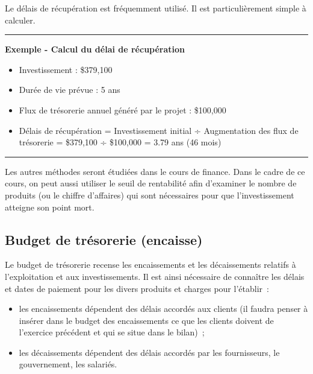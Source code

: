 \documentclass[oneside]{kaobook}
\begin{document}
Le délais de récupération est fréquemment utilisé. Il est particulièrement simple à calculer.

\noindent\rule{\textwidth}{0.5pt}
\textbf{Exemple - Calcul du délai de récupération}
\begin{itemize}
\item Investissement : \$379,100
\item Durée de vie prévue : 5  ans
\item Flux de trésorerie annuel généré par le projet : \$100,000
\item Délais de récupération = Investissement initial  ÷  Augmentation des flux de trésorerie = \$379,100 ÷ \$100,000 = 3.79 ans (46 mois)
\end{itemize}

\noindent\rule{\textwidth}{0.5pt}

Les autres méthodes seront étudiées dans le cours de finance. Dans le cadre de ce cours, on peut aussi utiliser le seuil de rentabilité afin d'examiner le nombre de produits (ou le chiffre d'affaires) qui sont nécessaires pour que l'investissement atteigne son point mort.

\subsection{Budget de trésorerie (encaisse)}
\label{sec:org469e166}
Le budget de trésorerie recense les encaissements et les décaissements relatifs à l'exploitation et aux investissements. Il est ainsi nécessaire de connaître les délais et dates de paiement pour les divers produits et charges pour l'établir :
\begin{itemize}
\item les encaissements dépendent des délais accordés aux clients (il faudra penser à insérer dans le budget des encaissements ce que les clients doivent de l'exercice précédent et qui se situe dans le bilan) ;
\item les décaissements dépendent des délais accordés par les fournisseurs, le gouvernement, les salariés.
\end{itemize}
\end{document}
